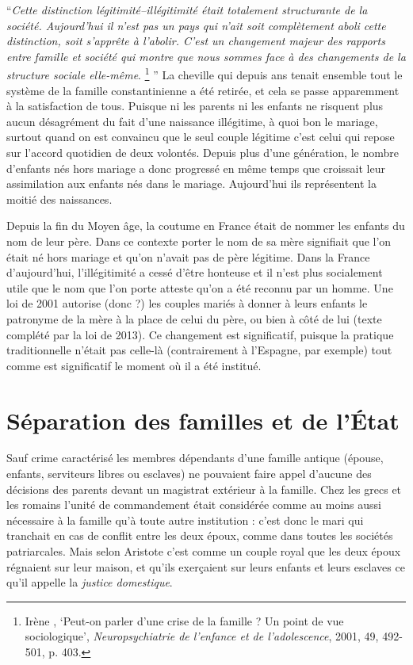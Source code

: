 \enquote{\emph{Cette distinction légitimité--illégitimité était totalement structurante de la société. Aujourd'hui il n'est pas un pays qui n'ait soit complètement aboli cette distinction, soit s'apprête à l'abolir. C'est un changement majeur des rapports entre famille et société qui montre que nous sommes face à des changements de la structure sociale elle-même}.%
\footnote{Irène , \enquote{Peut-on parler d'une crise de la famille ? Un point de vue sociologique}, \emph{Neuropsychiatrie de l'enfance et de l'adolescence}, 2001, 49, 492-501, p. 403.}%
} La cheville qui depuis  ans tenait ensemble tout le système de la famille constantinienne a été retirée, et cela se passe apparemment à la satisfaction de tous. Puisque ni les parents ni les enfants ne risquent plus aucun désagrément du fait d'une naissance illégitime, à quoi bon le mariage, surtout quand on est convaincu que le seul couple légitime c'est celui qui repose sur l'accord quotidien de deux volontés. Depuis plus d'une génération, le nombre d'enfants nés hors mariage a donc progressé en même temps que croissait leur assimilation aux enfants nés dans le mariage. Aujourd'hui ils représentent la moitié des naissances. 

 Depuis la fin du Moyen âge, la coutume en France était de nommer les enfants du nom de leur père. Dans ce contexte porter le nom de sa mère signifiait que l'on était né hors mariage et qu'on n'avait pas de père légitime. Dans la France d'aujourd'hui, l'illégitimité a cessé d'être honteuse et il n'est plus socialement utile que le nom que l'on porte atteste qu'on a été reconnu par un homme. Une loi de 2001 autorise (donc ?) les couples mariés à donner à leurs enfants le patronyme de la mère à la place de celui du père, ou bien à côté de lui (texte complété par la loi  de 2013). Ce changement est significatif, puisque la pratique traditionnelle n'était pas celle-là (contrairement à l'Espagne, par exemple) tout comme est significatif le moment où il a été institué. 


\section{Séparation des familles et de l'État}

 Sauf crime caractérisé les membres dépendants d'une famille antique (épouse, enfants, serviteurs libres ou esclaves) ne pouvaient faire appel d'aucune des décisions des parents devant un magistrat extérieur à la famille. Chez les grecs et les romains l'unité de commandement était considérée comme au moins aussi nécessaire à la famille qu'à toute autre institution : c'est donc le mari qui tranchait en cas de conflit entre les deux époux, comme dans toutes les sociétés patriarcales. Mais selon Aristote c'est comme un couple royal que les deux époux régnaient sur leur maison, et qu'ils exerçaient sur leurs enfants et leurs esclaves ce qu'il appelle la \emph{justice domestique}. 
 
